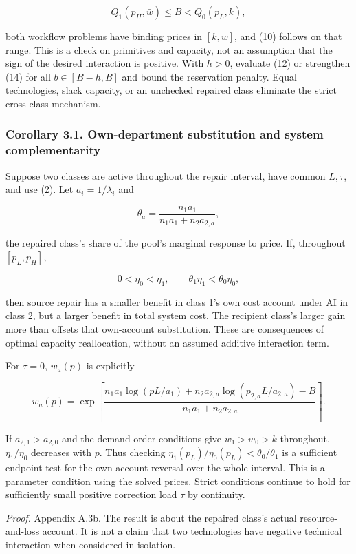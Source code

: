 \documentclass[
  11pt,
  a4paper,
]{article}
\begin{document}
\[Q_1(p_H,\bar w)\leq B<Q_0(p_L,k), \tag{14}\]

both workflow problems have binding prices in \([k,\bar w]\), and (10)
follows on that range. This is a check on primitives and capacity, not
an assumption that the sign of the desired interaction is positive. With
\(h>0\), evaluate (12) or strengthen (14) for all \(b\in[B-h,B]\) and
bound the reservation penalty. Equal technologies, slack capacity, or an
unchecked repaired class eliminate the strict cross-class mechanism.

\hypertarget{corollary-3.1.-own-department-substitution-and-system-complementarity}{%
\subsubsection{Corollary 3.1. Own-department substitution and system
complementarity}\label{corollary-3.1.-own-department-substitution-and-system-complementarity}}

Suppose two classes are active throughout the repair interval, have
common \(L,\tau\), and use (2). Let \(a_i=1/\lambda_i\) and

\[\theta_a=\frac{n_1 a_1}{n_1 a_1+n_2 a_{2,a}},\]

the repaired class's share of the pool's marginal response to price. If,
throughout \([p_L,p_H]\),

\[0<\eta_0<\eta_1,\qquad
\theta_1\eta_1<\theta_0\eta_0, \tag{15}\]

then source repair has a smaller benefit in class 1's own cost account
under AI in class 2, but a larger benefit in total system cost. The
recipient class's larger gain more than offsets that own-account
substitution. These are consequences of optimal capacity reallocation,
without an assumed additive interaction term.

For \(\tau=0\), \(w_a(p)\) is explicitly

\[w_a(p)=\exp\left[\frac{n_1a_1\log(pL/a_1)+n_2a_{2,a}\log(p_{2,a}L/a_{2,a})-B}
{n_1a_1+n_2a_{2,a}}\right]. \tag{16}\]

If \(a_{2,1}>a_{2,0}\) and the demand-order conditions give
\(w_1>w_0>k\) throughout, \(\eta_1/\eta_0\) decreases with \(p\). Thus
checking \(\eta_1(p_L)/\eta_0(p_L)<\theta_0/\theta_1\) is a sufficient
endpoint test for the own-account reversal over the whole interval. This
is a parameter condition using the solved prices. Strict conditions
continue to hold for sufficiently small positive correction load
\(\tau\) by continuity.

\emph{Proof.} Appendix A.3b. The result is about the repaired class's
actual resource-and-loss account. It is not a claim that two
technologies have negative technical interaction when considered in
isolation.
\end{document}
